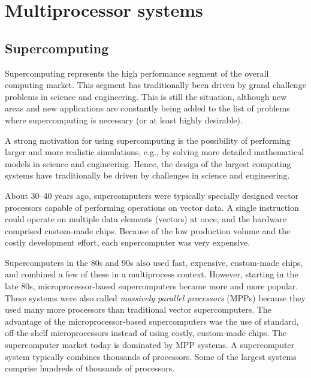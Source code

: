 \chapter{Multiprocessor systems}

\section{Supercomputing}

Supercomputing represents the high performance segment of the overall computing
market. This segment has traditionally been driven by grand challenge problems
in science and engineering. This is still the situation, although new areas and
new applications are constantly being added to the list of problems where
supercomputing is necessary (or at least highly desirable).

A strong motivation for using supercomputing is the possibility of performing
larger and more realistic simulations, e.g., by solving more detailed
mathematical models in science and engineering. Hence, the design of the largest
computing systems have traditionally be driven by challenges in science and
engineering.

About 30--40 years ago, supercomputers were typically specially designed vector
processors capable of performing operations on vector data. A single instruction
could operate on multiple data elements (vectors) at once, and the hardware
comprised custom-made chips. Because of the low production volume and the costly
development effort, each supercomputer was very expensive.

Supercomputers in the 80s and 90s also used fast, expensive, custom-made chips,
and combined a few of these in a multiprocess context. However, starting in the
late 80s, microprocessor-based supercomputers became more and more popular.
These systems were also called \emph{massively parallel processors} (MPPs)
because they used many more processors than traditional vector supercomputers.
The advantage of the microprocessor-based supercomputers was the use of
standard, off-the-shelf microprocessors instead of using costly, custom-made
chips. The supercomputer market today is dominated by MPP systems. A
supercomputer system typically combines thousands of processors. Some of the
largest systems comprise hundreds of thousands of processors.

